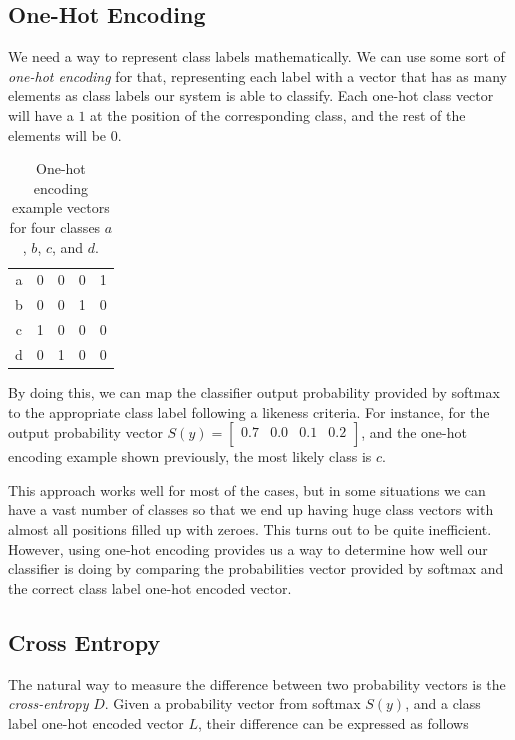\documentclass[english, 11pt]{article}
\begin{document}
	\subsection{One-Hot Encoding}

	We need a way to represent class labels mathematically. We can use some sort of \emph{one-hot encoding} for that, representing each label with a vector that has as many elements as class labels our system is able to classify. Each one-hot class vector will have a $1$ at the position of the corresponding class, and the rest of the elements will be $0$.

	\begin{table}[!hbt]
		\centering
		\begin{tabular}{c|cccc}
			a & 0 & 0 & 0 & 1\\
			b & 0 & 0 & 1 & 0\\
			c & 1 & 0 & 0 & 0\\
			d & 0 & 1 & 0 & 0\\
		\end{tabular}
		\caption{One-hot encoding example vectors for four classes $a$, $b$, $c$, and $d$.}
	\end{table}

By doing this, we can map the classifier output probability provided by softmax to the appropriate class label following a likeness criteria. For instance, for the output probability vector $S(y)=\begin{bmatrix} 0.7 & 0.0 & 0.1 & 0.2\\ \end{bmatrix}$, and the one-hot encoding example shown previously, the most likely class is $c$.

	This approach works well for most of the cases, but in some situations we can have a vast number of classes so that we end up having huge class vectors with almost all positions filled up with zeroes. This turns out to be quite inefficient. However, using one-hot encoding provides us a way to determine how well our classifier is doing by comparing the probabilities vector provided by softmax and the correct class label one-hot encoded vector.

	\subsection{Cross Entropy}

	The natural way to measure the difference between two probability vectors is the \emph{cross-entropy} $D$. Given a probability vector from softmax $S(y)$, and a class label one-hot encoded vector $L$, their difference can be expressed as follows
\end{document}
